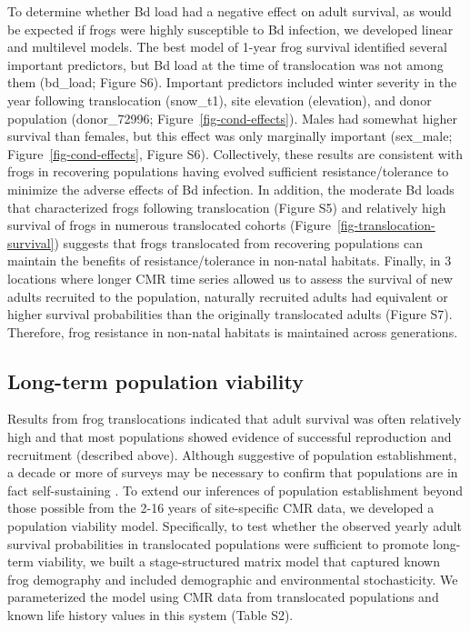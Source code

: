 \documentclass[9pt,twocolumn,twoside,lineno]{pnas-new}
\begin{document}
To determine whether Bd load had a negative effect on adult survival, as
would be expected if frogs were highly susceptible to Bd infection, we
developed linear and multilevel models. The best model of 1-year frog
survival identified several important predictors, but Bd load at the
time of translocation was not among them (bd\_load;
Figure S6). Important predictors included
winter severity in the year following translocation (snow\_t1), site
elevation (elevation), and donor population (donor\_72996;
Figure~\ref{fig-cond-effects}). Males had somewhat higher survival than
females, but this effect was only marginally important (sex\_male;
Figure~\ref{fig-cond-effects}, Figure S6).
Collectively, these results are consistent with frogs in recovering
populations having evolved sufficient resistance/tolerance to minimize
the adverse effects of Bd infection. In addition, the moderate Bd loads
that characterized frogs following translocation
(Figure S5) and relatively high survival of
frogs in numerous translocated cohorts
(Figure~\ref{fig-translocation-survival}) suggests that frogs
translocated from recovering populations can maintain the benefits of
resistance/tolerance in non-natal habitats. Finally, in 3 locations
where longer CMR time series allowed us to assess the survival of new
adults recruited to the population, naturally recruited adults had
equivalent or higher survival probabilities than the originally
translocated adults (Figure S7). Therefore,
frog resistance in non-natal habitats is maintained across generations.

\subsection*{Long-term population viability}

Results from frog translocations indicated that adult survival was often
relatively high and that most populations showed evidence of successful
reproduction and recruitment (described above). Although suggestive of
population establishment, a decade or more of surveys may be necessary
to confirm that populations are in fact self-sustaining
\citep{joseph2018}. To extend our inferences of population establishment
beyond those possible from the 2-16 years of site-specific CMR data, we
developed a population viability model. Specifically, to test whether
the observed yearly adult survival probabilities in translocated
populations were sufficient to promote long-term viability, we built a
stage-structured matrix model that captured known frog demography and
included demographic and environmental stochasticity. We parameterized
the model using CMR data from translocated populations and known life
history values in this system (Table S2).
\end{document}

